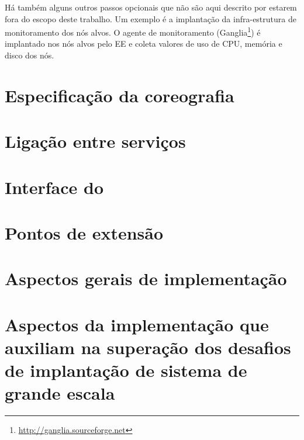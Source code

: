 Há também alguns outros passos opcionais que não são aqui descrito por estarem fora
do escopo deste trabalho. Um exemplo é a implantação da infra-estrutura de monitoramento
dos nós alvos. O agente de monitoramento 
(Ganglia\footnote{\url{http://ganglia.sourceforge.net}})
é implantado nos nós alvos pelo EE e
coleta valores de uso de CPU, memória e disco dos nós.

\section{Especificação da coreografia}
\label{sec:spec}

\section{Ligação entre serviços}
\label{sec:ligacao}

\section{Interface do \ee}
\label{sec:interface}

\section{Pontos de extensão}
\label{sec:extensao}

\section{Aspectos gerais de implementação}

\section{Aspectos da implementação que auxiliam na superação dos desafios de implantação de sistema de grande escala}
